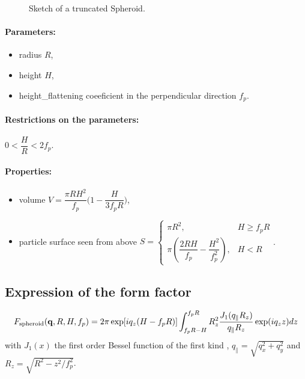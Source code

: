 \begin{figure}[ht]
\begin{center}
\caption{Sketch of a truncated Spheroid.}
\end{center}
\label{spheroid}
\end{figure}

\paragraph{Parameters:}
\begin{itemize}
\item radius $R$,
\item height $H$,
\item height\_flattening coeeficient in the perpendicular direction $f_p$.
\end{itemize}

\paragraph{Restrictions on the parameters:} $0< \dfrac{H}{R}< 2f_p$.

\paragraph{Properties:}
\begin{itemize}
\item volume $V = \dfrac{\pi R H^2}{f_p}  \Big(1-\dfrac{H}{3f_p R}\Big)$,
\item particle surface seen from above $S = \left\{\begin{array}{ll} \pi R^2, & H \geq f_pR \\
         \pi\left(\dfrac{2RH}{f_p}-\dfrac{H^2}{f_p^2}\right), & H < R \end{array}\right.$.
\end{itemize}

\subsection{Expression of the form factor}
\begin{equation*}
F_{\rm{spheroid}}(\mathbf{q},R, H,f_p) =   2\pi \exp[iq_z(H-f_pR)] \int_{f_p R-H} ^{f_p R} R_z
        ^2\frac{J_1(q_{\parallel}R_z)}{q_{\parallel}R_z} \exp(i q_z z) dz
\end{equation*}
with $J_1(x)$ the first order
Bessel function of the first kind \cite{AbSt64}, $q_{\parallel}=\sqrt{q_x^2+q_y^2} $ and $R_z=\sqrt{R^2-z^2/f_p^2}$.

